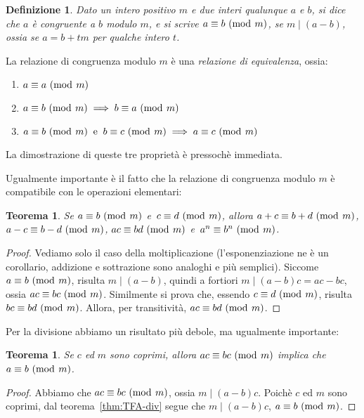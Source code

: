 \documentclass[pdflatex,11pt,a4paper,oneside]{article}
\newcommand{\acro}[1]{\text{{\frenchspacing {#1} }}}
\newcommand{\ie}[0]{\acro{i.e.}}
\newcommand{\p}[1]{\left({#1}\right)}
\newcommand{\divides}[0]{\mid}
\newcommand{\congruent}[0]{\equiv}
\newcommand{\mmodop}[0]{\ensuremath{\operatorname{mod}}}
\newcommand{\mmod}[1]{\ensuremath{\allowbreak\ (\mmodop\:{#1})}}
\newtheorem{theorem}[TheoremLike]{Teorema}
\newtheorem{definition}[TheoremLike]{Definizione}
\begin{document}
\begin{definition}
Dato un intero positivo $m$ e due interi qualunque $a$ e $b$, si dice che
\emph{$a$ \`e congruente a $b$ modulo $m$}, e si scrive $a \congruent b
\mmod m$, se $m \divides \p{a - b}$, ossia se $a = b + tm$ per qualche
intero $t$.
\end{definition}

La relazione di congruenza modulo $m$ \`e una \emph{relazione di
equivalenza}, ossia:
\begin{enumerate}
\item $a \congruent a \mmod m$
\item $a \congruent b \mmod m \implies b \congruent a \mmod m$
\item $a \congruent b \mmod m ~\:\textrm{e}\:~
       b \congruent c \mmod m \implies
       a \congruent c \mmod m$
\end{enumerate}
La dimostrazione di queste tre propriet\`a \`e pressoch\`e immediata.

\smallskip
Ugualmente importante \`e il fatto che la relazione di congruenza
modulo $m$ \`e compatibile con le operazioni elementari:
%
\begin{theorem}\label{thm:modular-operation}
Se $a \congruent b \mmod m$ e\, $c \congruent d \mmod m$, allora
$a + c \congruent b + d \mmod m$, $a - c \congruent b - d \mmod m$,
$ac \congruent bd \mmod m$ e\, $a^n \congruent b^n \mmod m$.

\end{theorem}
%
\begin{proof}
Vediamo solo il caso della moltiplicazione (l'esponenziazione ne \`e
un corollario, addizione e sottrazione sono analoghi e pi\`u semplici).
Siccome $a \congruent b \mmod m$, risulta $m \divides \p{a - b}$,
quindi a fortiori $m \divides \p{a - b}c = ac - bc$, ossia
$ac \congruent bc \mmod m$.  Similmente si prova che, essendo
$c \congruent d \mmod m$, risulta $bc \congruent bd \mmod m$.
Allora, per transitivit\`a, $ac \congruent bd \mmod m$.
\end{proof}

Per la divisione abbiamo un risultato pi\`u debole, ma ugualmente
importante:
%
\begin{theorem}\label{thm:simplify-modulo-m}
Se $c$ ed $m$ sono coprimi, allora $ac \congruent bc \mmod m$ implica
che $a \congruent b \mmod m$.
\end{theorem}
%
\begin{proof}
Abbiamo che $ac \congruent bc \mmod m$, ossia $m \divides \p{a -b}c$.
Poich\`e $c$ ed $m$ sono coprimi, dal teorema~\eqref{thm:TFA-div}
segue che $m \divides \p{a -b}c$, \ie $a \congruent b \mmod m$.
\end{proof}
\end{document}
